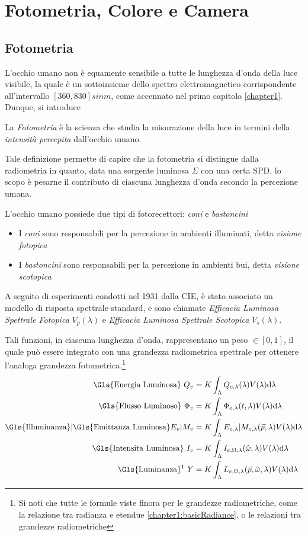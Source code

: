 \label{chapter2}
\chapter{Fotometria, Colore e Camera}
\section{Fotometria}
L'occhio umano non \`e equamente sensibile a tutte le lunghezza d'onda della luce visibile, la quale \`e un sottoinsieme dello spettro elettromagnetico
corrispondente all'intervallo $[360,830] si{nm}$, come accennato nel primo capitolo \ref{chapter1}. Dunque, si introduce
\begin{definitionS}
	La \textit{Fotometria} \`e la scienza che studia la misurazione della luce in termini della \textit{intensit\`a percepita} dall'occhio umano.
\end{definitionS}
Tale definizione permette di capire che la fotometria si distingue dalla radiometria in quanto, data una sorgente luminosa $\Sigma$ con una certa
SPD, lo scopo \`e pesarne il contributo di ciascuna lunghezza d'onda secondo la percezione umana.\par
L'occhio umano possiede due tipi di fotorecettori: \textit{coni} e \textit{bastoncini}
\begin{itemize}[topsep=0pt, noitemsep]
	\item[] I \textit{coni} sono responsabili per la percezione in ambienti illuminati, detta \textit{visione fotopica}
	\item[] I \textit{bastoncini} sono responsabili per la percezione in ambienti bui, detta \textit{visione scotopica}
\end{itemize}
A seguito di esperimenti condotti nel 1931 dalla CIE, \`e stato associato un modello di risposta spettrale standard, e sono chiamate 
\textit{Efficacia Luminosa Spettrale Fotopica} $V_p(\lambda)$ e \textit{Efficacia Luminosa Spettrale Scotopica} $V_s(\lambda)$.\par
Tali funzioni, in ciascuna lunghezza d'onda, rappresentano un peso $\in[0,1]$, il quale pu\`o essere integrato con una grandezza radiometrica spettrale
per ottenere l'analoga grandezza fotometrica.\footnote{Si noti che tutte le formule viste finora per le grandezze radiometriche, come la relazione 
tra radianza e etendue \ref{chapter1:basicRadiance}, o le relazioni tra grandezze radiometriche}
\begin{align} \label{chapter2:photometricQuantities}
	\text{\Gls{Energia Luminosa} } Q_v &= K\int_\Lambda Q_{e,\lambda}(\lambda)V(\lambda)\mathrm{d}\lambda\\
	\text{\Gls{Flusso Luminoso} } \Phi_v &= K\int_\Lambda\Phi_{e,\lambda}(t, \lambda)V(\lambda)\mathrm{d}\lambda\\
	\text{\Gls{Illuminanza}|\Gls{Emittanza Luminosa}} E_v|M_v &= K\int_\Lambda E_{e,\lambda}|M_{e,\lambda}(\vec{p},\lambda)V(\lambda)\mathrm{d}\lambda\\
	\text{\Gls{Intensita Luminosa} } I_v &= K\int_\Lambda I_{e,\Omega,\lambda}(\hat{\omega},\lambda)V(\lambda)\mathrm{d}\lambda\\
	\text{\Gls{Luminanza}\footnotemark{} } Y &= K\int_\Lambda L_{e,\Omega,\lambda}(\vec{p},\hat{\omega},\lambda)V(\lambda)\mathrm{d}\lambda
\end{align}
